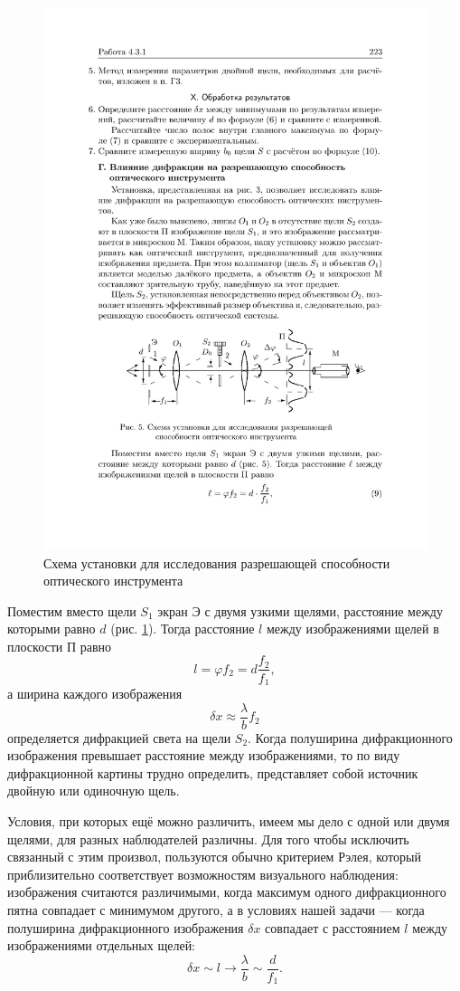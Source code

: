 \documentclass[a4paper,12pt]{article} %
\begin{document}
\begin{figure}[h!]
	\centering
	\includegraphics[width=0.8\linewidth]{d.pdf}
	\caption{Схема установки для исследования разрешающей
		способности оптического инструмента}
	\label{labG}
\end{figure}

Поместим вместо щели $S_1$ экран Э с двумя узкими щелями, расстояние между которыми равно $d$ (рис. \ref{labG}). Тогда расстояние $l$ между изображениями щелей в плоскости П равно
\begin{equation}
l = \varphi f_2 = d \dfrac{f_2}{f_1},
\end{equation}
а ширина каждого изображения
\begin{equation}
\delta x \approx \dfrac{\lambda}{b} f_2
\end{equation}
определяется дифракцией света на щели $S_2$. Когда полуширина дифракционного изображения превышает расстояние между изображениями, то по виду дифракционной картины трудно определить, представляет собой источник двойную или одиночную щель.

Условия, при которых ещё можно различить, имеем мы дело с одной или двумя щелями, для разных наблюдателей различны. Для того чтобы исключить связанный с этим произвол, пользуются обычно критерием Рэлея, который приблизительно соответствует возможностям визуального наблюдения: изображения считаются различимыми, когда максимум одного дифракционного пятна совпадает с минимумом другого, а в условиях нашей задачи --- когда полуширина дифракционного изображения $\delta x$ совпадает с расстоянием $l$ между изображениями отдельных щелей:
\begin{equation}
\delta x \sim l \to \dfrac{\lambda}{b} \sim \dfrac{d}{f_1}.
\end{equation}
\end{document}
